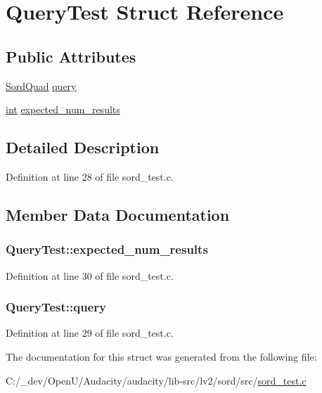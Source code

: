 \hypertarget{struct_query_test}{}\section{Query\+Test Struct Reference}
\label{struct_query_test}
\subsection*{Public Attributes}
\begin{DoxyCompactItemize}
\item 
\hyperlink{group__sord_gac79773a042527877d00158c75a41bab2}{Sord\+Quad} \hyperlink{struct_query_test_a99e3f89cea4298480b0e507ef6439e87}{query}
\item 
\hyperlink{xmltok_8h_a5a0d4a5641ce434f1d23533f2b2e6653}{int} \hyperlink{struct_query_test_a2f240206cc49143bddfa57efee3d792f}{expected\+\_\+num\+\_\+results}
\end{DoxyCompactItemize}


\subsection{Detailed Description}


Definition at line 28 of file sord\+\_\+test.\+c.



\subsection{Member Data Documentation}
\subsubsection[{\texorpdfstring{expected\+\_\+num\+\_\+results}{expected_num_results}}]{ Query\+Test\+::expected\+\_\+num\+\_\+results}\hypertarget{struct_query_test_a2f240206cc49143bddfa57efee3d792f}{}\label{struct_query_test_a2f240206cc49143bddfa57efee3d792f}


Definition at line 30 of file sord\+\_\+test.\+c.

\subsubsection[{\texorpdfstring{query}{query}}]{ Query\+Test\+::query}\hypertarget{struct_query_test_a99e3f89cea4298480b0e507ef6439e87}{}\label{struct_query_test_a99e3f89cea4298480b0e507ef6439e87}


Definition at line 29 of file sord\+\_\+test.\+c.



The documentation for this struct was generated from the following file\+:\begin{DoxyCompactItemize}
\item 
C\+:/\+\_\+dev/\+Open\+U/\+Audacity/audacity/lib-\/src/lv2/sord/src/\hyperlink{sord__test_8c}{sord\+\_\+test.\+c}\end{DoxyCompactItemize}
